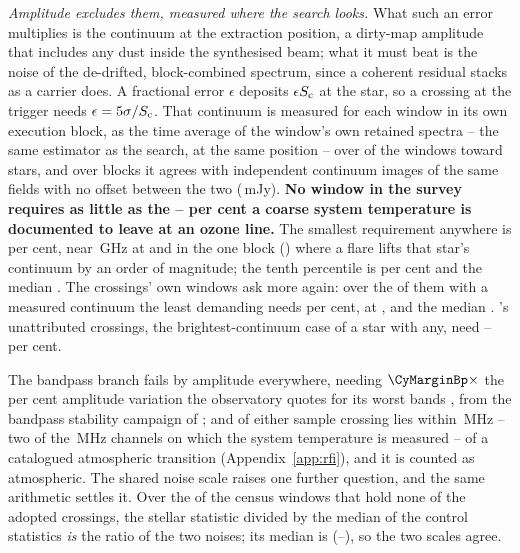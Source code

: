 \emph{Amplitude excludes them, measured where the search looks.} What such
an error multiplies is the continuum at the extraction position, a dirty-map
amplitude that includes any dust inside the synthesised beam; what it must
beat is the noise of the de-drifted, block-combined spectrum, since a
coherent residual stacks as a carrier does. A fractional error $\epsilon$
deposits $\epsilon S_{\rm c}$ at the star, so a crossing at the trigger needs
$\epsilon=5\sigma/S_{\rm c}$. That continuum is measured for each window in
its own execution block, as the time average of the window's own retained
spectra -- the same estimator as the search, at the same position -- over
\CyNWinMeas{} of the \CyNWinTot{} windows toward \CyNStarMeas{} stars, and
over \CyNRouteBlock{} blocks it agrees with independent continuum images of
the same fields with no offset between the two (\CyRouteBiasMJy\,mJy).
\textbf{No window in the survey requires as little as the
\CySpecTsysLo--\CySpecTsysHi{} per cent a coarse system temperature is
documented to leave at an ozone line.} The smallest requirement anywhere is
\CyEpsMinPct{} per cent, near \CyEpsMinGHz\,GHz at \CyEpsMinStar{} and in the
one block (\texttt{\CyEpsMinBlock}) where a flare lifts that star's continuum
by an order of magnitude; the tenth percentile is \CyEpsTenthPct{} per cent
and the median \CyEpsMedPct. The crossings' own windows ask more again: over
the \CyNCrossMeas{} of them with a measured continuum the least demanding
needs \CyCrossEpsLoPct{} per cent, at \CyCrossEpsLoStar, and the median
\CyCrossEpsMedPct. \CxAuStar's \CyAuNCross{} unattributed crossings, the
brightest-continuum case of a star with any, need
\CyAuCrossEpsLoPct--\CyAuCrossEpsHiPct{} per cent.

The bandpass branch fails by amplitude everywhere, needing
$\CyMarginBp\times$ the \CdSpecBpWorst{} per cent amplitude variation the
observatory quotes for its worst bands \citep{ALMAKBBandpass}, from the
bandpass stability campaign of \citet{ALMATechNote15}; and of either sample
\ScNInRad{} crossing lies within \ScRadMHz\,MHz -- two of the
\CdSpecTsysRes\,MHz channels on which the system temperature is measured --
of a catalogued atmospheric transition
(Appendix~\ref{app:rfi}), and it is counted as atmospheric. The shared noise scale raises one
further question, and the same arithmetic settles it. Over the \NsrNWin{} of
the \NWindows{} census windows that hold none of the adopted crossings, the
stellar statistic divided by the median of the \NCtrl{} control statistics
\emph{is} the ratio of the two noises; its median is \NsrMed{}
(\NsrLo--\NsrHi), so the two scales agree.

